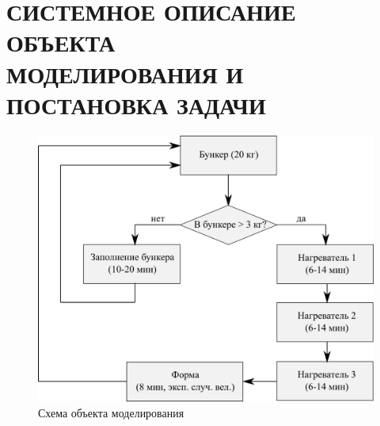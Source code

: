 \section[Системное описание объекта моделирования и постановка задачи]{
  СИСТЕМНОЕ ОПИСАНИЕ ОБЪЕКТА  \\ 
  МОДЕЛИРОВАНИЯ И ПОСТАНОВКА ЗАДАЧИ}

\begin{figure}[h!]
  \centering
  \includegraphics[width=150mm]{pic/scheme}
  \caption{Схема объекта моделирования}
  \label{pic:scheme}
\end{figure}
